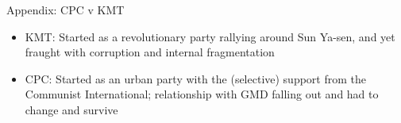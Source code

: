 \documentclass[
  10pt,
  ignorenonframetext,
]{beamer}
\begin{document}
\begin{frame}{Appendix: CPC v KMT}
\label{appendix-cpc-v-kmt}
\begin{itemize}
  \item KMT: Started as a revolutionary party rallying around Sun Ya-sen, and yet fraught with corruption and internal fragmentation
  \vspace{1cm}
  \item CPC: Started as an urban party with the (selective) support from the Communist International; relationship with GMD falling out and had to change and survive
\end{itemize}
\end{frame}
\end{document}

